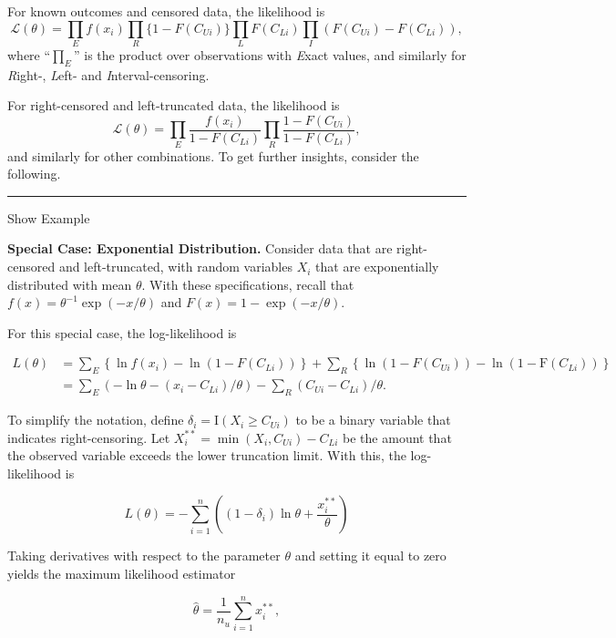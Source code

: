 \documentclass[]{book}
\theoremstyle{definition}
\theoremstyle{definition}
\theoremstyle{definition}
\theoremstyle{remark}
\begin{document}
For known outcomes and censored data, the likelihood is
\[\mathcal{L}(\theta) = \prod_{E} f(x_i) \prod_{R} \{1-F(C_{Ui})\} \prod_{L}
F(C_{Li}) \prod_{I} (F(C_{Ui})-F(C_{Li})),\] where ``\(\prod_{E}\)'' is
the product over observations with \emph{E}xact values, and similarly
for \emph{R}ight-, \emph{L}eft- and \emph{I}nterval-censoring.

For right-censored and left-truncated data, the likelihood is
\[\mathcal{L}(\theta) = \prod_{E} \frac{f(x_i)}{1-F(C_{Li})} \prod_{R} \frac{1-F(C_{Ui})}{1-F(C_{Li})},\]
and similarly for other combinations. To get further insights, consider
the following.

\begin{center}\rule{0.5\linewidth}{\linethickness}\end{center}

Show Example

\hypertarget{toggleExampleEXP}{}
\textbf{Special Case: Exponential Distribution.} Consider data that are
right-censored and left-truncated, with random variables \(X_i\) that
are exponentially distributed with mean \(\theta\). With these
specifications, recall that \(f(x) = \theta^{-1} \exp(-x/\theta)\) and
\(F(x) = 1-\exp(-x/\theta)\).

For this special case, the log-likelihood is

\[\begin{aligned}
L(\theta) &= \sum_{E} \left\{ \ln f(x_i) - \ln (1-F(C_{Li})) \right\} + \sum_{R}\left\{ \ln (1-F(C_{Ui}))- \ln (1-\mathrm{F}(C_{Li})) \right\}\\
&= \sum_{E} (-\ln \theta -(x_i-C_{Li})/\theta ) -\sum_{R} (C_{Ui}-C_{Li})/\theta .
\end{aligned}\]

To simplify the notation, define
\(\delta_i = \mathrm{I}(X_i \geq C_{Ui})\) to be a binary variable that
indicates right-censoring. Let
\(X_i^{\ast \ast} = \min(X_i, C_{Ui}) - C_{Li}\) be the amount that the
observed variable exceeds the lower truncation limit. With this, the
log-likelihood is

\begin{equation} 
  L(\theta) =  - \sum_{i=1}^n ((1-\delta_i) \ln \theta + \frac{x_i^{\ast \ast}}{\theta})
  \label{eq:EXPloglik}
\end{equation}

Taking derivatives with respect to the parameter \(\theta\) and setting
it equal to zero yields the maximum likelihood estimator

\[\widehat{\theta}  = \frac{1}{n_u} \sum_{i=1}^n  x_i^{\ast \ast},\]
\end{document}
